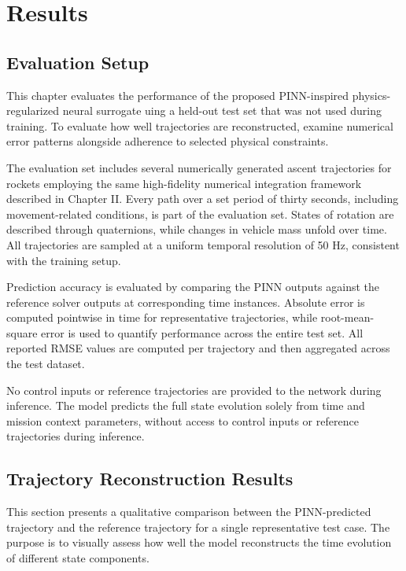 \chapter{Results}

\section{Evaluation Setup}

This chapter evaluates the performance of the proposed PINN-inspired physics-regularized 
neural surrogate uing a held-out test set that was not used during training. To evaluate 
how well trajectories are reconstructed, examine numerical error patterns alongside adherence 
to selected physical constraints.

The evaluation set includes several numerically generated ascent trajectories for rockets employing 
the same high-fidelity numerical integration framework described in Chapter II. Every 
path over a set period of thirty seconds, including movement-related conditions, is part 
of the evaluation set. States of rotation are described through quaternions, while 
changes in vehicle mass unfold over time. All trajectories are sampled at a 
uniform temporal resolution of 50 Hz, consistent with the training setup.

Prediction accuracy is evaluated by comparing the PINN outputs against the reference 
solver outputs at corresponding time instances. Absolute error is computed 
pointwise in time for representative trajectories, while root-mean-square 
error is used to quantify performance across the entire test set. All reported 
RMSE values are computed per trajectory and then aggregated across the test 
dataset.

No control inputs or reference trajectories are provided to the network during 
inference. The model predicts the full state evolution solely from time and mission 
context parameters, without access to control inputs or reference trajectories during 
inference.

\section{Trajectory Reconstruction Results}

This section presents a qualitative comparison between the PINN-predicted 
trajectory and the reference trajectory for a single representative test 
case. The purpose is to visually assess how well the model reconstructs the 
time evolution of different state components.

